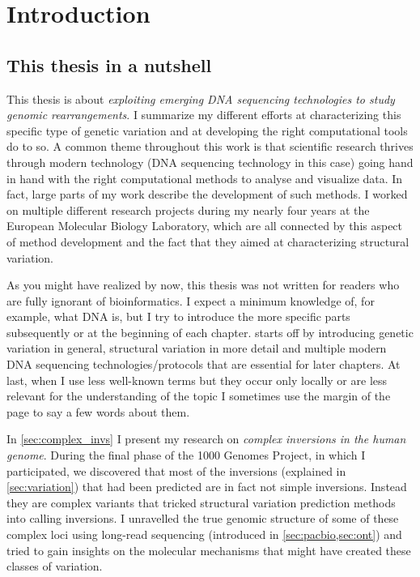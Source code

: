 \chapter{Introduction}
\label{sec:intro}


\section{This thesis in a nutshell}
This thesis is about \emph{exploiting emerging DNA sequencing technologies to
study genomic rearrangements}. I summarize my different efforts at
characterizing this specific type of genetic variation and at developing the
right computational tools do to so. A common theme throughout this work is that
scientific research thrives through modern technology (DNA sequencing technology
in this case) going hand in hand with the right computational methods to analyse
and visualize data. In fact, large parts of my work describe the development of
such methods. I worked on multiple different research projects during my nearly
four years at the European Molecular Biology Laboratory, which are all connected
by this aspect of method development and the fact that they aimed at
characterizing structural variation.

As you might have realized by now, this
thesis was not written for readers who are fully ignorant of bioinformatics. I
expect a minimum knowledge of, for example, what DNA is, but I try to introduce
the more specific parts subsequently or at the beginning of each chapter.
 starts off by introducing genetic variation in general,
structural variation in more detail and multiple modern DNA sequencing
technologies/protocols that are essential for later chapters. At last, when I
use less well-known terms but they occur only locally or are less relevant for
the understanding of the topic I sometimes use the margin of the page to say a
few words about them.

In \cref{sec:complex_invs} I present my research on \emph{complex inversions in
the human genome}. During the final phase of the 1000 Genomes Project, in which
I participated, we discovered that most of the inversions (explained in
\cref{sec:variation}) that had been predicted are in fact not simple inversions.
Instead they are complex variants that tricked structural variation prediction
methods into calling inversions. I unravelled the true genomic structure of some
of these complex loci using long-read sequencing (introduced in
\cref{sec:pacbio,sec:ont}) and tried to gain insights on the molecular
mechanisms that might have created these classes of variation.

